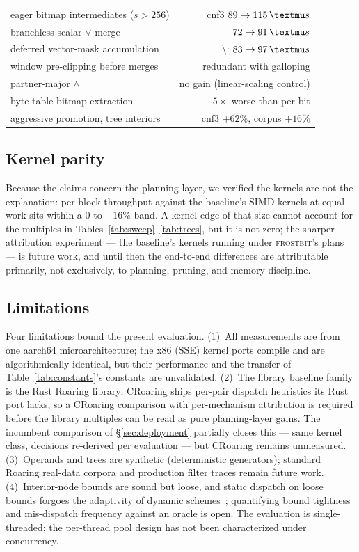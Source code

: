 \documentclass[sigconf,nonacm]{acmart}
\newcommand{\fb}{\textsc{frostbit}}
\newcommand{\us}{\,\textmu s}
\begin{document}
\begin{table}[t]
\begin{tabular}{p{5.4cm}r}
\midrule
eager bitmap intermediates ($s > 256$) & cnf3 $89 \to 115\us$ \\
branchless scalar $\vee$ merge & $72 \to 91\us$ \\
deferred vector-mask accumulation & $\setminus$: $83 \to 97\us$ \\
window pre-clipping before merges & redundant with galloping \\
partner-major $\wedge$ & no gain (linear-scaling control) \\
byte-table bitmap extraction & $5\times$ worse than per-bit \\
aggressive promotion, tree interiors & cnf3 $+62\%$, corpus $+16\%$ \\
\bottomrule
\end{tabular}
\end{table}

\subsection{Kernel parity}

Because the claims concern the planning layer, we verified the kernels
are not the explanation: per-block throughput against the baseline's
SIMD kernels at equal work sits within a $0$ to $+16\%$ band. A kernel
edge of that size cannot account for the multiples in
Tables~\ref{tab:sweep}--\ref{tab:trees}, but it is not zero; the
sharper attribution experiment --- the baseline's kernels running under
\fb's plans --- is future work, and until then the end-to-end
differences are attributable primarily, not exclusively, to planning,
pruning, and memory discipline.

\subsection{Limitations}
\label{sec:limitations}

Four limitations bound the present evaluation. (1)~All measurements are
from one aarch64 microarchitecture; the x86 (SSE) kernel ports compile
and are algorithmically identical, but their performance and the
transfer of Table~\ref{tab:constants}'s constants are unvalidated.
(2)~The library baseline family is the Rust Roaring library; CRoaring
ships per-pair dispatch heuristics its Rust port lacks, so a CRoaring
comparison with per-mechanism attribution is required before the
library multiples can be read as pure planning-layer gains. The
incumbent comparison of \S\ref{sec:deployment} partially closes this
--- same kernel class, decisions re-derived per evaluation --- but
CRoaring remains unmeasured.
(3)~Operands and trees are synthetic (deterministic generators);
standard Roaring real-data corpora and production filter traces remain
future work. (4)~Interior-node bounds are sound but loose, and static
dispatch on loose bounds forgoes the adaptivity of dynamic
schemes~\cite{raman2007}; quantifying bound tightness and
mis-dispatch frequency against an oracle is open. The evaluation is
single-threaded; the per-thread pool design has not been characterized
under concurrency.
\end{document}
